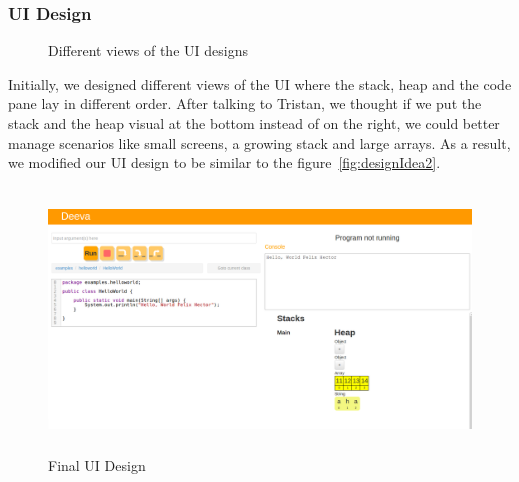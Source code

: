 \documentclass[11pt, a4paper]{article}
\begin{document}
\subsubsection{UI Design}
\begin{figure}[h!]
\centering
{}
\quad
{}
\caption{Different views of the UI designs}
\end{figure}

Initially, we designed different views of the UI where the stack, heap and the code pane lay in different order.
After talking to Tristan, we thought if we put the stack and the heap visual at the bottom instead of on the right, we could better manage scenarios like small screens, a growing stack and large arrays.
As a result, we modified our UI design to be similar to the figure~\ref{fig:designIdea2}.\\
\begin{figure}[h!]
\centering
\includegraphics[height=70mm,width=130mm]{finalDesign.png}
\caption{Final UI Design}
\label{fig:finalDesign}
\end{figure}
\end{document}
